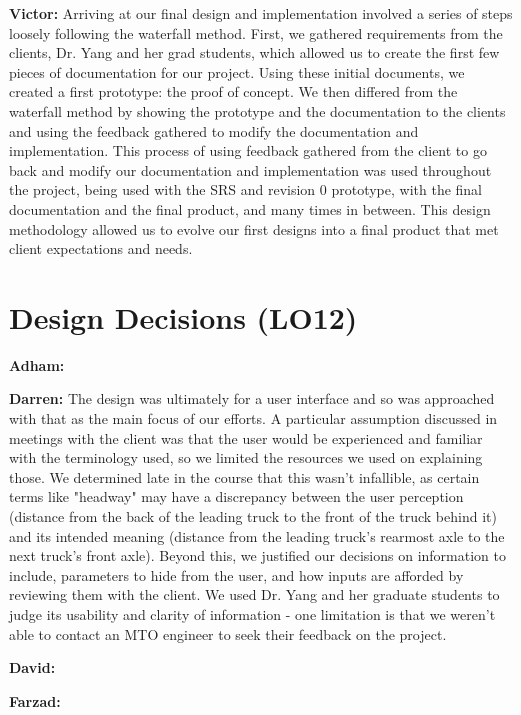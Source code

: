 \documentclass{article}
\begin{document}
\textbf{Victor:} Arriving at our final design and implementation involved a series of steps loosely following the waterfall method. First, we gathered requirements from the clients, Dr. Yang and her grad students, which allowed us to create the first few pieces of documentation for our project. Using these initial documents, we created a first prototype: the proof of concept. We then differed from the waterfall method by showing the prototype and the documentation to the clients and using the feedback gathered to modify the documentation and implementation. This process of using feedback gathered from the client to go back and modify our documentation and implementation was used throughout the project, being used with the SRS and revision 0 prototype, with the final documentation and the final product, and many times in between. This design methodology allowed us to evolve our first designs into a final product that met client expectations and needs.

\section{Design Decisions (LO12)}


\textbf{Adham:}

\textbf{Darren:} The design was ultimately for a user interface and so was approached with that as the main focus of our efforts. A particular assumption discussed in meetings with the client was that the user would be experienced and familiar with the terminology used, so we limited the resources we used on explaining those. We determined late in the course that this wasn't infallible, as certain terms like "headway" may have a discrepancy between the user perception (distance from the back of the leading truck to the front of the truck behind it) and its intended meaning (distance from the leading truck's rearmost axle to the next truck's front axle). Beyond this, we justified our decisions on information to include, parameters to hide from the user, and how inputs are afforded by reviewing them with the client. We used Dr. Yang and her graduate students to judge its usability and clarity of information - one limitation is that we weren't able to contact an MTO engineer to seek their feedback on the project.

\textbf{David:}

\textbf{Farzad:}
\end{document}
